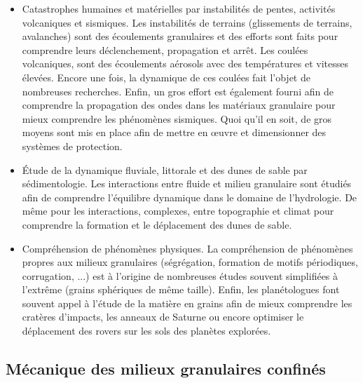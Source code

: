 			\begin{itemize}
				\item Catastrophes humaines et matérielles par instabilités de pentes, activités volcaniques et sismiques. Les instabilités de terrains (glissements de terrains, avalanches) sont des écoulements granulaires et des efforts sont faits pour comprendre leurs déclenchement, propagation et arrêt. Les coulées volcaniques, sont des écoulements aérosols avec des températures et vitesses élevées. Encore une fois, la dynamique de ces coulées fait l'objet de nombreuses recherches. Enfin, un gros effort est également fourni afin de comprendre la propagation des ondes dans les matériaux granulaire pour mieux comprendre les phénomènes sismiques. Quoi qu'il en soit, de gros moyens sont mis en place afin de mettre en \oe{}uvre et dimensionner des systèmes de protection.
				\item \'Etude de la dynamique fluviale, littorale et des dunes de sable par sédimentologie. Les interactions entre fluide et milieu granulaire sont étudiés afin de comprendre l'équilibre dynamique dans le domaine de l'hydrologie. De même pour les interactions, complexes, entre topographie et climat pour comprendre la formation et le déplacement des dunes de sable.
				\item Compréhension de phénomènes physiques. La compréhension de phénomènes propres aux milieux granulaires (ségrégation, formation de motifs périodiques, corrugation, ...) est à l'origine de nombreuses études souvent simplifiées à l'extrême (grains sphériques de même taille). Enfin, les planétologues font souvent appel à l'étude de la matière en grains afin de mieux comprendre les cratères d'impacts, les anneaux de Saturne ou encore optimiser le déplacement des rovers sur les sols des planètes explorées.
			\end{itemize}
	\subsection{Mécanique des milieux granulaires confinés}

